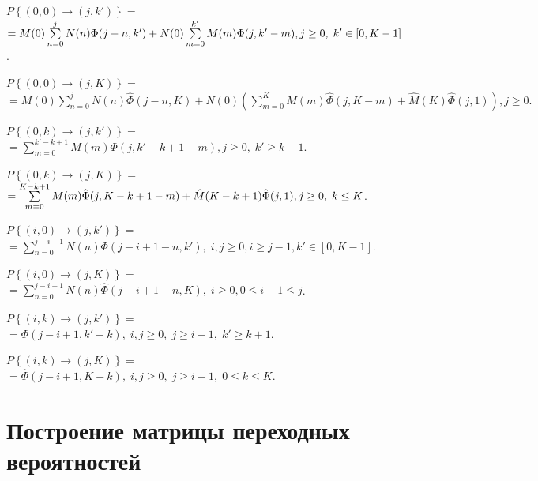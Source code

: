 \documentclass[12pt, a4paper]{article}
\begin{document}
$P\left\{(0, 0) \rightarrow (j, k' ) \right\}=$\\
$=M(0)\sum\limits_{n = 0}^{j}N(n)\Phi(j-n, k') + N(0)\sum\limits_{m = 0}^{k'}M(m)\Phi(j, k' - m),\\ j\geq 0,\; k' \in [0, K-1]$.

$P\left\{(0, 0) \rightarrow (j, K) \right\}=$\\
$=M(0)\sum\limits_{n = 0}^{j}N(n)\hat\Phi(j-n, K) + N(0)(\sum\limits_{m = 0}^{K}M(m)\hat\Phi(j, K - m) + \hat M(K)\hat \Phi(j, 1)),  j\geq 0.$

$P\left\{(0, k) \rightarrow (j, k') \right\}=$\\
$ =\sum\limits_{m = 0}^{k'-k+1}M(m)\Phi(j,k' - k + 1 - m), j\geq 0,\; k' \geq k-1.$

$P\left\{(0, k) \rightarrow (j, K)\right\}=$\\
$= \sum\limits_{m = 0}^{K-k+1}M(m) \hat \Phi(j, K - k + 1 - m) + \hat M(K - k + 1)\hat \Phi(j, 1),\\ j\geq 0,\; k \leq K$.

$P\left\{(i, 0) \rightarrow (j, k')  \right\}=$\\
$= \sum\limits_{n = 0}^{j - i + 1}N(n)\Phi(j - i + 1 - n, k'),\; i, j\geq 0, i \geq j-1, k' \in [0, K-1] $.

$P\left\{(i, 0) \rightarrow (j, K) \right\}=$\\
$ =\sum\limits_{n = 0}^{j - i + 1}N(n)\hat \Phi(j - i + 1 - n, K),\; i \geq 0,0 \leq i-1 \leq j $.

$P\left\{(i, k) \rightarrow (j, k') \right\}=$\\
$ =\Phi(j - i + 1, k' - k),\; i, j\geq 0,\;j\geq i-1,\; k' \geq k + 1$.

$P\left\{(i, k) \rightarrow (j, K)\right\}=$\\
$= \hat \Phi(j - i + 1, K - k),\; i, j\geq 0,\;j\geq i-1,\; 0 \leq k \leq K $.

\section{Построение матрицы переходных вероятностей}
\end{document}
